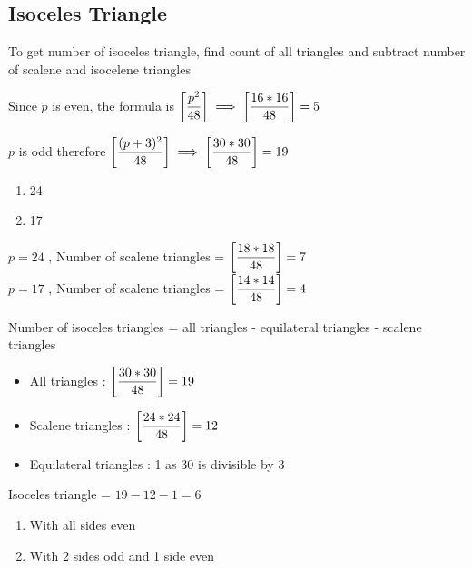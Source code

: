 \subsection{Isoceles Triangle}
To get number of isoceles triangle, find count of all triangles and subtract number of scalene and isocelene triangles


Since $p$ is even, the formula is $\left [  \dfrac{p^2}{48}  \right ] \implies \left [  \dfrac{16 * 16}{48}  \right ] = 5$

$p$ is odd therefore $\left [  \dfrac{(p+3)^2}{48}  \right ] \implies \left [  \dfrac{30 * 30}{48}  \right ] = 19$

\vspace{3cm}

\begin{enumerate}
    \item 24
    \item 17
\end{enumerate}



$p = 24$ , Number of scalene triangles = $\left [ \dfrac{18 * 18}{48} \right ] = 7$ \\

$p = 17$ , Number of scalene triangles = $\left [ \dfrac{14 * 14}{48} \right ] = 4$


Number of isoceles triangles = all triangles - equilateral triangles - scalene triangles

\begin{itemize}
    \item All triangles : $\left [ \dfrac{30 * 30}{48} \right ] = 19$
    \item Scalene triangles : $\left [ \dfrac{24 * 24}{48} \right ] = 12$
    \item Equilateral triangles : 1 as 30 is divisible by 3
\end{itemize}

Isoceles triangle = $19 - 12 - 1 = 6$

\begin{enumerate}
    \item With all sides even
    \item With 2 sides odd and 1 side even
\end{enumerate}

